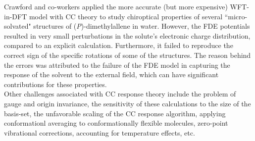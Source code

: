Crawford and co-workers\cite{Crawford15} applied the more accurate (but more expensive) WFT-in-DFT model with CC theory 
to study chiroptical properties of several ``micro-solvated" structures of ({\em P})-dimethylallene in water. However, the
FDE potentials resulted in very small perturbations in the solute's electronic charge distribution, compared to an explicit 
calculation. Furthermore, it failed to reproduce the correct sign of the specific rotations of some of 
the structures. The reason behind the errors was attributed to the failure of the FDE model in capturing
the response of the solvent to the external field, which can have significant contributions for these properties.\\
Other challenges associated with CC response theory include the problem of gauge and origin invariance, 
the sensitivity of these calculations to the size of the basis-set, the unfavorable scaling of the CC response algorithm, 
applying conformationl averaging to conformationally flexible molecules, zero-point vibrational corrections, accounting for temperature effects, etc.\cite{Crawford06}
